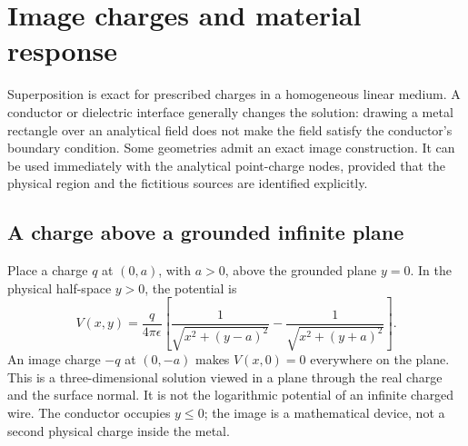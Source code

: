 \section{Image charges and material response}
\label{sec:electric-images}

Superposition is exact for prescribed charges in a homogeneous linear medium.
A conductor or dielectric interface generally changes the solution: drawing
a metal rectangle over an analytical field does not make the field satisfy
the conductor's boundary condition. Some geometries admit an exact image
construction. It can be used immediately with the analytical point-charge
nodes, provided that the physical region and the fictitious sources are
identified explicitly.

\subsection{A charge above a grounded infinite plane}
Place a charge $q$ at $(0,a)$, with $a>0$, above the grounded plane $y=0$.
In the physical half-space $y>0$, the potential is
\[
 V(x,y)=\frac{q}{4\pi\epsilon}
 \left[\frac{1}{\sqrt{x^2+(y-a)^2}}
       -\frac{1}{\sqrt{x^2+(y+a)^2}}\right].
\]
An image charge $-q$ at $(0,-a)$ makes $V(x,0)=0$ everywhere on the plane.
This is a three-dimensional solution viewed in a plane through the real
charge and the surface normal. It is not the logarithmic potential of an
infinite charged wire. The conductor occupies $y\leq0$; the image is a
mathematical device, not a second physical charge inside the metal.

\begin{codeexample}[width=0pt]
\end{codeexample}

